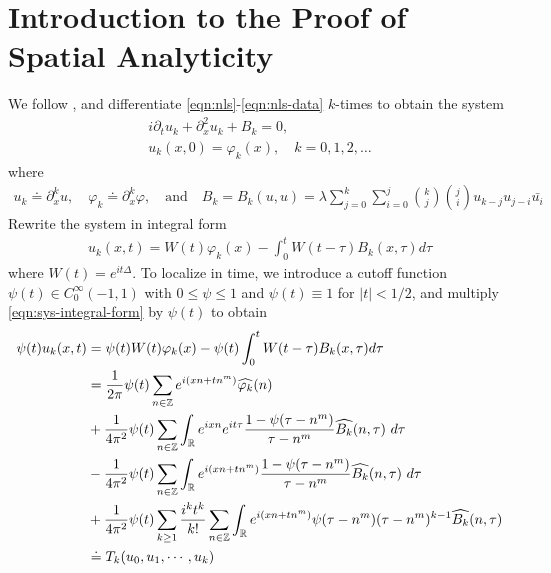 \documentclass[12pt,reqno]{amsart}
\numberwithin{equation}{section}  %
\numberwithin{figure}{section}
\newcommand{\rr}{\mathbb{R}}
\newcommand{\zz}{\mathbb{Z}}
\newcommand{\wh}{\widehat}
\newcommand{\p}{\partial}
\newcommand{\vp}{\varphi}
\theoremstyle{plain}
\theoremstyle{definition}
\theoremstyle{remark}
\begin{document}
\section{Introduction to the Proof of Spatial Analyticity} 
\label{sec:space-anal}
We follow \cite{Gorsky:2005fk}, and differentiate
\eqref{eqn:nls}-\eqref{eqn:nls-data} $k$-times to obtain the system
%
%
\begin{gather}
  i \p_t u_k + \p^2_x u_k + B_{k}= 0, 
  \label{eqn:nls-system}
  \\
  u_{k}(x,0) = \vp_k(x), \quad k=0,1,2,\ldots
  \label{eqn:nls-system-init-data}
\end{gather}
%
%
where
\begin{gather*}
  u_k \doteq \p_x^k u, \quad \vp_k \doteq \p_x^k \vp, \quad \text{and}
  \quad B_k = B_{k}(u,u) =
  \lambda \sum_{j=0}^{k} \sum_{i=0}^{j} {k \choose j}{j \choose i} u_{k-j} u_{j-i}
  \bar{u_i}
  \label{eqn:system-notat}
\end{gather*}
Rewrite the system in integral form
%
%
\begin{equation}
\begin{split}
  u_k(x,t) = W(t) \vp_{k}(x) - \int_{0}^{t} W(t- \tau)B_{k}(x, \tau) d \tau
  \label{eqn:sys-integral-form}
\end{split}
\end{equation}
%
%
where $W(t) = e^{it \Delta}$. To localize in time, we introduce a cutoff
function $\psi(t) \in C^{\infty}_{0}(-1,1)$ with $0 \le \psi \le 1$ and
$\psi(t) \equiv 1$ for $| t | < 1/2$, and multiply \eqref{eqn:sys-integral-form}
by $\psi(t)$ to obtain
%
%
\begin{align}
\psi(t) u_k(x,t)
& = \psi(t) W(t) \vp_{k}(x) - \psi(t) \int_{0}^{t} W(t-
\tau)B_{k}(x, \tau) d \tau \notag
\\
\label{main-int-expression-1}
    & = \frac{1}{2 \pi} \psi(t) \sum_{n \in \zz} e^{i(xn + tn^{m 
    })} \widehat{\vp_k}(n) 
    \\
    & + \frac{1}{4 \pi^2} \psi(t) \sum_{n\in \zz} \int_\rr e^{ixn}  
    e^{it \tau} \frac{ 1 - \psi(\tau -  n^m) 
    }{\tau -  n^m} \wh{B_k}(n, \tau) \ d \tau
    \label{main-int-expression-2}
    \\
    \label{main-int-expression-3}
    & - \frac{1}{4 \pi^2} \psi(t) \sum_{n\in \zz} \int_\rr e^{i(xn + 
    t n^m)}
     \frac{1- \psi(\tau -  n^m)}{\tau -  n^m} \wh{B_k}(n, \tau) \ d \tau
    \\
    \label{main-int-expression-4}
    & + \frac{1}{4 \pi^2} \psi(t) \sum_{k \ge 1} \frac{i^k t^k}{k!}
    \sum_{n \in \zz} \int_\rr e^{i(xn + t n^m )}
    \psi(\tau -  n^m) (\tau -  n^m)^{k-1} \wh{B_k}(n, \tau)  
    \\
    & \doteq T_k(u_0, u_1,\cdots,u_k) \notag
\end{align}
\end{document}

